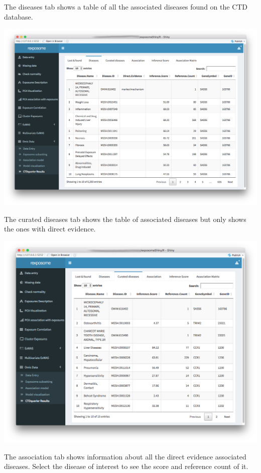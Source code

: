 \documentclass[
]{book}
\begin{document}
The diseases tab shows a table of all the associated diseases found on the CTD database.

\includegraphics{images/analysis10_5.png}

The curated diseases tab shows the table of associated diseases but only shows the ones with direct evidence.

\includegraphics{images/analysis10_6.png}

The association tab shows information about all the direct evidence associated diseases. Select the disease of interest to see the score and reference count of it.
\end{document}
